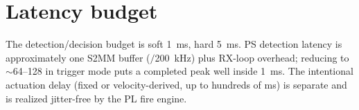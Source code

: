 \section{Latency budget}
The detection/decision budget is soft \SI{1}{\milli\second}, hard
\SI{5}{\milli\second}. PS detection latency is approximately one S2MM buffer
($/$\SI{200}{\kilo\hertz}) plus RX-loop overhead;
reducing  to $\sim$64--128 in trigger mode puts a
completed peak well inside \SI{1}{\milli\second}. The intentional actuation delay
(fixed or velocity-derived, up to hundreds of ms) is separate and is realized
jitter-free by the PL fire engine.

